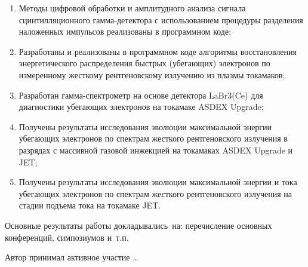 {}
\begin{enumerate}[beginpenalty=10000] %
  \item Методы цифровой обработки и амплитудного анализа сигнала сцинтилляционного гамма-детектора с использованием процедуры разделения наложенных импульсов реализованы в программном коде;
  \item Разработаны и реализованы в программном коде алгоритмы восстановления энергетического распределения быстрых (убегающих) электронов по измеренному жесткому рентгеновскому излучению из плазмы токамаков;
  \item Разработан гамма-спектрометр на основе детектора LaBr3(Ce) для диагностики убегающих электронов на токамаке ASDEX Upgrade;
  \item Получены результаты исследования эволюции максимальной энергии убегающих электронов по спектрам жесткого рентгеновского излучения в разрядах с массивной газовой инжекцией на токамаках ASDEX Upgrade и JET;
  \item Получены результаты исследования эволюции максимальной энергии и тока убегающих электронов по спектрам жесткого рентгеновского излучения на стадии подъема тока на токамаке JET.
\end{enumerate}




{\probation}
Основные результаты работы докладывались~на:
перечисление основных конференций, симпозиумов и~т.\:п.

{\contribution} Автор принимал активное участие \ldots

